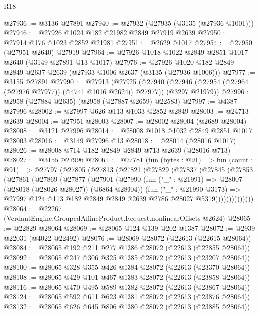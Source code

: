 \begin{lexlean}{R18}
\begin{coremodule}
@27936 := @3136 @27891
@27940 := @27932 (@27935 (@3135 (@27936 @1001)))
@27946 := @27926 @1024 @182 @21982 @2849 @27919 @2639
@27950 := @27914 @176 @1023 @2852 @21981
@27951 := @2629 @1017
@27954 := @27950 (@27951 @2640) @27919
@27964 := @27926 @1018 @1022 @2849 @2851 @1017 @2640 (@3149 @27891 @13 @1017)
@27976 := @27926 @1020 @182 @2849 @2849 @2637 @2639 (@27933 @1006 @2637 (@3135 (@27936 @1006)))
@27977 := @3155 @27891
@27990 := @27913
    (@27925
      (@27940 (@27946 (@27954 (@27964 (@27976 @27977)) (@4741 @1016 @2624)) @27977))
      (@3297 @21979))
@27996 := @2958 (@27884 @2635) (@2958 (@27887 @2659) @22583)
@27997 := @4387 @27996
@28002 := @27997 @626 @113 @1033 @2852 @2849
@28003 := @24713 @2639
@28004 := @27951 @28003
@28007 := @28002 @28004 (@2689 @28004)
@28008 := @3121 @27996
@28014 := @28008 @1018 @1032 @2849 @2851 @1017 @28003
@28016 := @3149 @27996 @13
@28018 := @28014 (@28016 @1017)
@28026 := @28008 @714 @182 @2849 @2849 @713 @2639 (@28016 @713)
@28027 := @3155 @27996
@28061 := @27781
    (fun (bytes : @91) =>
    fun (count : @91) =>
    @27797
      (@27805
        (@27813
          (@27821
            (@27829
              (@27837
                (@27845
                  (@27853
                    (@27861
                      (@27869
                        (@27877
                          (@27901
                            (@27990
                              (fun ("_" : @21991) => @28007 (@28018 (@28026 @28027)) (@6864 @28004))
                              (fun ("_" : @21990 @3173) =>
                              @27997
                                @124
                                @113
                                @182
                                @2849
                                @2849
                                @2639
                                @2786
                                @28027
                                @5319))))))))))))))
@28064 := @22267 (VerdantEngine.GroupedAffineProduct.Request.nonlinearOffsets @2624)
@28065 := @22829 @28064
@28069 := @28065 @124 @139 @202 @1387
@28072 := @2939 @22031 (@4022 @22492)
@28076 := @28069 @28072 (@22613 (@22615 @28064))
@28084 := @28065 @192 @211 @277 @1386 @28072 (@22613 (@22855 @28064))
@28092 := @28065 @247 @306 @325 @1385 @28072 (@22613 (@23207 @28064))
@28100 := @28065 @328 @355 @426 @1384 @28072 (@22613 (@23370 @28064))
@28108 := @28065 @429 @101 @467 @1383 @28072 (@22613 (@23858 @28064))
@28116 := @28065 @470 @495 @589 @1382 @28072 (@22613 (@23867 @28064))
@28124 := @28065 @592 @611 @623 @1381 @28072 (@22613 (@23876 @28064))
@28132 := @28065 @626 @645 @806 @1380 @28072 (@22613 (@23885 @28064))

\end{coremodule}
\end{lexlean}
